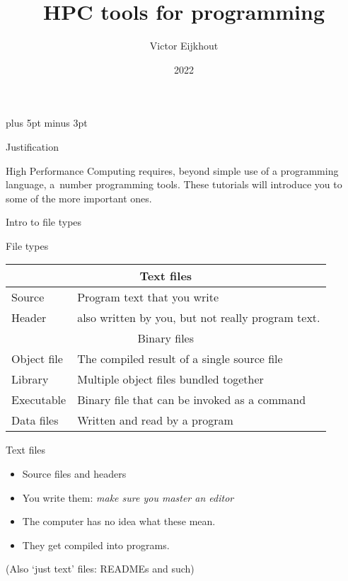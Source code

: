 \documentclass[11pt,headernav]{beamer}
\begin{document}
\parskip=10pt plus 5pt minus 3pt

\title{HPC tools for programming}
\author{Victor Eijkhout}
\date{2022}

\begin{frame}{}
  \titlepage
\end{frame}


\begin{numberedframe}{Justification}

  High Performance Computing requires,
  beyond simple use of a programming language,
  a~number programming tools. These tutorials
  will introduce you to some of the more important ones.

\end{numberedframe}

 {Intro to file types}

\begin{numberedframe}{File types}
  \label{sl-tut:file-type}
  \begin{tabular}{ll}
    \toprule
    \multicolumn{2}{c}{Text files}\\
    \midrule
    Source&Program text that you write\\
    Header&also written by you, but not really program text.\\
    \midrule
    \multicolumn{2}{c}{Binary files}\\
    \midrule
    Object file&The compiled result of a single source file\\
    Library&Multiple object files bundled together\\
    Executable&Binary file that can be invoked as a command\\
    Data files&Written and read by a program\\
    \bottomrule
  \end{tabular}
\end{numberedframe}

\begin{numberedframe}{Text files}
  \label{sl-tut:text-file}
  \begin{itemize}
  \item Source files and headers
  \item You write them: \emph{make sure you master an editor}
  \item The computer has no idea what these mean.
  \item They get compiled into programs.
  \end{itemize}
  (Also `just text' files: READMEs and such)
\end{numberedframe}
\end{document}
